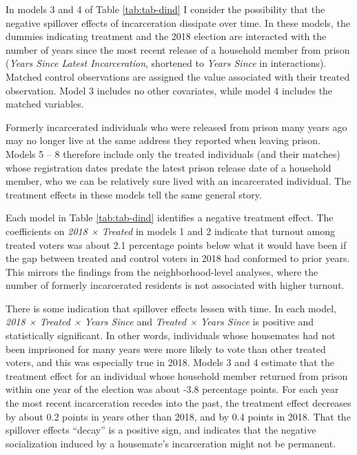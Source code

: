 \documentclass[
  12pt,
]{article}
\begin{document}
In models 3 and 4 of Table \ref{tab:tab-dind} I consider the possibility that the negative spillover effects of incarceration dissipate over time. In these models, the dummies indicating treatment and the 2018 election are interacted with the number of years since the most recent release of a household member from prison (\emph{Years Since Latest Incarceration}, shortened to \emph{Years Since} in interactions). Matched control observations are assigned the value associated with their treated observation. Model 3 includes no other covariates, while model 4 includes the matched variables.

Formerly incarcerated individuals who were released from prison many years ago may no longer live at the same address they reported when leaving prison. Models 5 -- 8 therefore include only the treated individuals (and their matches) whose registration dates predate the latest prison release date of a household member, who we can be relatively sure lived with an incarcerated individual. The treatment effects in these models tell the same general story.

\begin{singlespace}

\end{singlespace}

Each model in Table \ref{tab:tab-dind} identifies a negative treatment effect. The coefficients on \emph{2018 × Treated} in models 1 and 2 indicate that turnout among treated voters was about 2.1 percentage points below what it would have been if the gap between treated and control voters in 2018 had conformed to prior years. This mirrors the findings from the neighborhood-level analyses, where the number of formerly incarcerated residents is not associated with higher turnout.

There is some indication that spillover effects lessen with time. In each model, \emph{2018 × Treated × Years Since} and \emph{Treated × Years Since} is positive and statistically significant. In other words, individuals whose housemates had not been imprisoned for many years were more likely to vote than other treated voters, and this was especially true in 2018. Models 3 and 4 estimate that the treatment effect for an individual whose household member returned from prison within one year of the election was about -3.8 percentage points. For each year the most recent incarceration recedes into the past, the treatment effect decreases by about 0.2 points in years other than 2018, and by 0.4 points in 2018. That the spillover effects ``decay'' is a positive sign, and indicates that the negative socialization induced by a housemate's incarceration might not be permanent.
\end{document}
